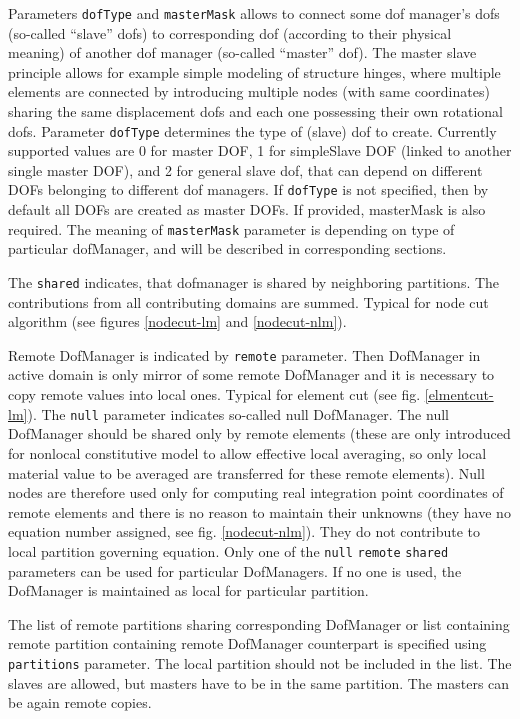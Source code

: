 \documentclass[a4paper]{report}
\newcommand{\param}[1]{\texttt{#1}} %
\newcommand{\Pmode}[1]{{\sffamily #1}}
\begin{document}
Parameters \param{dofType} and \param{masterMask} allows to connect some dof manager's dofs
(so-called ``slave'' dofs)
to corresponding dof (according to their physical meaning) of another
dof manager (so-called ``master'' dof). The master slave principle
allows for example simple modeling of structure hinges, where multiple
elements are connected by introducing multiple nodes (with same
coordinates) sharing the same displacement dofs and each one possessing
their own rotational dofs.
Parameter
\param{dofType} determines the type of (slave) dof to
create. Currently supported values are 0 for master DOF, 1 for simpleSlave DOF (linked to another single master DOF), and 2 for general
slave dof, that can depend on different DOFs belonging to different
dof managers.
If \param{dofType} is not specified, then by default all DOFs are
created as master DOFs. If provided, masterMask is also required.
The meaning of \param{masterMask} parameter is
depending on type of particular dofManager, and will be described in
corresponding sections.

\Pmode{
The \param{shared} indicates, that dofmanager is shared by
neighboring partitions. The contributions from all contributing
domains are summed. Typical for node cut algorithm (see figures \ref{nodecut-lm}
and \ref{nodecut-nlm}).

Remote DofManager is indicated by \param{remote} parameter.
Then DofManager in active domain is only mirror of some remote
DofManager and it is necessary to copy remote values into local
ones. Typical for element cut (see fig. \ref{elmentcut-lm}).
The \param{null} parameter indicates so-called null DofManager. The
null DofManager should be shared only by remote elements (these are
only introduced for nonlocal constitutive model to allow effective
local averaging, so only local material value to be averaged are
transferred for these remote elements). Null nodes are therefore used
only for computing real integration point coordinates of remote
elements and there is no reason to maintain their unknowns (they have
no equation number assigned, see fig. \ref{nodecut-nlm}). They do not
contribute to local partition governing equation.
Only one of the \param{null} \param{remote} \param{shared} parameters can
be used for particular DofManagers. If no one is used, the DofManager
is maintained as local for particular partition.

The list of remote partitions sharing corresponding DofManager or list
containing  remote partition containing remote DofManager counterpart is
specified using \param{partitions} parameter. The local partition
should not be included in the list.
The slaves are allowed, but masters have to be in the same
partition. The masters can be again remote copies.
}
\end{document}
